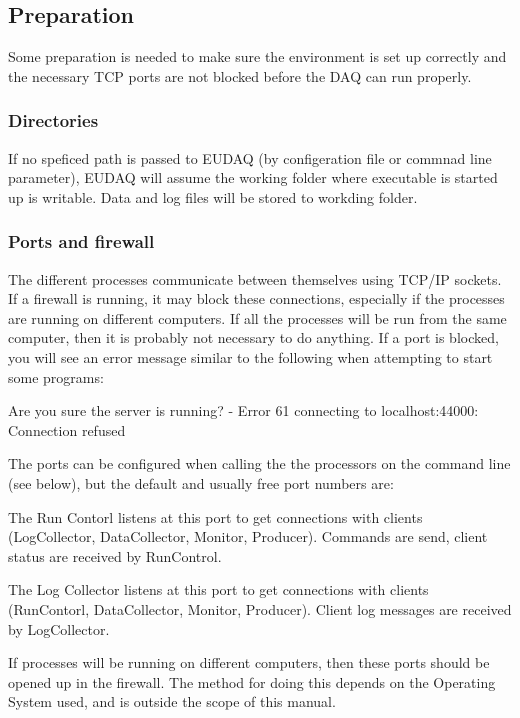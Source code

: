 \subsection{Preparation}
Some preparation is needed to make sure the environment is set up correctly and
the necessary TCP ports are not blocked before the DAQ can run properly.

\subsubsection{Directories}
If no speficed path is passed to EUDAQ (by configeration file or commnad line parameter), EUDAQ will assume the working folder where executable is started up  is writable. Data and log files will be stored to workding folder.

\subsubsection{Ports and firewall}
The different processes communicate between themselves using TCP/IP sockets.
If a firewall is running, it may block these connections,
especially if the processes are running on different computers.
If all the processes will be run from the same computer,
then it is probably not necessary to do anything.
If a port is blocked, you will see an error message similar to the following
when attempting to start some programs:
\begin{listing}[]
Are you sure the server is running? - Error 61 connecting to localhost:44000: Connection refused
\end{listing}

The ports can be configured when calling the the processors on the command line (see below), but the default and usually free port numbers are:
\begin{description}

The Run Contorl listens at this port to get connections with clients (LogCollector, DataCollector, Monitor, Producer). Commands are send, client status are received by RunControl. 


The Log Collector listens at this port to get connections with clients (RunContorl, DataCollector, Monitor, Producer). Client log messages are received by LogCollector.

\end{description}

If processes will be running on different computers,
then these ports should be opened up in the firewall.
The method for doing this depends on the Operating System used,
and is outside the scope of this manual.


